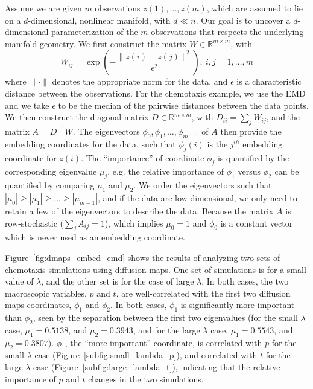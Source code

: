 \documentclass[prl, reprint, final, showkeys]{revtex4-1}
\begin{document}
Assume we are given $m$ observations $z(1), \dots, z(m)$, which are assumed to lie on a $d$-dimensional, nonlinear manifold, with $d \ll n$. 
%
Our goal is to uncover a $d$-dimensional parameterization of the $m$ observations that respects the underlying manifold geometry.
%
We first construct the matrix $W \in \mathbb{R}^{m \times m}$, with
\begin{equation} \label{eq:W}
W_{ij} = \exp \left( -\frac{\|z(i) - z(j) \|^2}{\epsilon^2} \right), \ i,j=1,\ldots,m
\end{equation}
where $\| \cdot \|$ denotes the appropriate norm for the data, and $\epsilon$ is a characteristic distance between the observations. 
%
For the chemotaxis example, we use the EMD and we take $\epsilon$ to be the median of the pairwise distances between the data points.
%
We then construct the diagonal matrix $D \in \mathbb{R}^{m \times m}$, with $D_{ii} = \sum_j W_{ij}$, and the matrix $A  = D^{-1} W.$
%
The eigenvectors $\phi_0, \phi_1, \dots, \phi_{m-1}$ of $A$ then provide the embedding coordinates for the data, such that
$\phi_{j}(i)$ is the $j^{th}$ embedding coordinate for $z(i)$.
%
The ``importance'' of coordinate $\phi_j$ is quantified by the corresponding eigenvalue $\mu_j$, e.g. the relative importance of $\phi_1$ versus $\phi_2$ can be quantified by comparing $\mu_1$ and $\mu_2$.
%
We order the eigenvectors such that $|\mu_0| \ge |\mu_1| \ge \dots \ge |\mu_{m-1}|$, and if the data are low-dimensional, we only need to retain a few of the eigenvectors to describe the data.
%
Because the matrix $A$ is row-stochastic ($\sum_j A_{ij} = 1$), which implies $\mu_0 = 1$ and $\phi_0$ is a constant vector which is never used as an embedding coordinate.

Figure~\ref{fig:dmaps_embed_emd} shows the results of analyzing two sets of chemotaxis simulations using diffusion maps. 
%
One set of simulations is for a small value of $\lambda$, and the other set is for the case of large $\lambda$. 
%
In both cases, the two macroscopic variables, $p$ and $t$, are well-correlated with the first two diffusion maps coordinates, $\phi_1$ and $\phi_2$. 
%
In both cases, $\phi_1$ is significantly more important than $\phi_2$, seen by the separation between the first two eigenvalues (for the small $\lambda$ case, $\mu_1 = 0.5138$, and $\mu_2 = 0.3943$, and for the large $\lambda$ case, $\mu_1 = 0.5543$, and $\mu_2 = 0.3807$).
%
$\phi_1$, the ``more important'' coordinate, is correlated with $p$ for the small $\lambda$ case (Figure~\ref{subfig:small_lambda_p}), and correlated with $t$ for the large $\lambda$ case (Figure~\ref{subfig:large_lambda_t}), indicating that the relative importance of $p$ and $t$ changes in the two simulations. 
\end{document}
